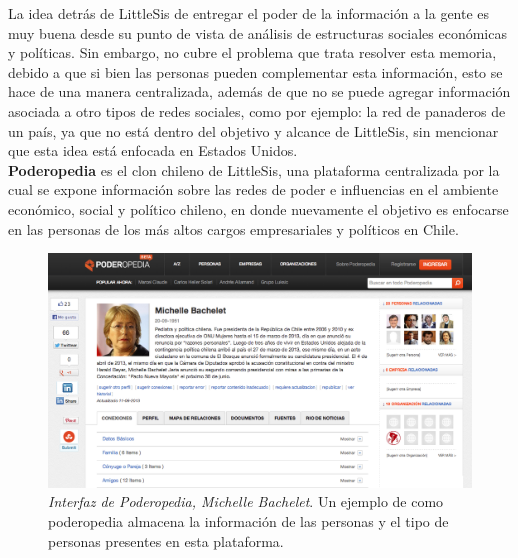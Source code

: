 La idea detrás de LittleSis de entregar el poder de la información a la gente es muy buena desde su punto de vista de análisis de estructuras sociales económicas y políticas. Sin embargo, no cubre el problema que trata resolver esta memoria, debido a que si bien las personas pueden complementar esta información, esto se hace de una manera centralizada, además de que no se puede agregar información asociada a otro tipos de redes sociales, como por ejemplo: la red de panaderos de un país, ya que no está dentro del objetivo y alcance de LittleSis, sin mencionar que esta idea está enfocada en Estados Unidos.\\

\textbf{Poderopedia} es el clon chileno de LittleSis, una plataforma centralizada por la cual se expone información sobre las redes de poder e influencias en el ambiente económico, social y político chileno, en donde nuevamente el objetivo es enfocarse en las personas de los más altos cargos empresariales y políticos en Chile.\\

\begin{figure}[H]
  \includegraphics[width=1.0\textwidth]{images/poderopedia.png}
  \caption[Interfaz de Poderopedia, Michelle Bachelet]{\emph{Interfaz de Poderopedia, Michelle Bachelet}. Un ejemplo de como poderopedia almacena la información de las personas y el tipo de personas presentes en esta plataforma.}
  \label{ejemplo_poderopedia}
\end{figure}

